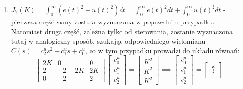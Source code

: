 \documentclass{article}
\begin{document}
\begin{enumerate}[(a)]
\begin{enumerate}[label=(\arabic*.)]
$$\begin{array}{c}
                    -K < 0\\
                    \lambda(-K) = 0
                \end{array}
                \right\}
                \implies
                \left\{
                \begin{array}{c}
                    K = 1\\
                    \lambda = 0
                \end{array}
                \right\}.
            $$
            Zatem optymalna wartość wskaźnika jakości wynosi:
            $$
                J_{1}(1) = \frac{1}{2} + \frac{1}{2} = 1.
            $$
            \item $J_{7}(K) = \int_{0}^{\infty}{\left( e(t)^2 + u(t)^2 \right)dt} = \int_{0}^{\infty}{e(t)^2dt} + \int_{0}^{\infty}{u(t)^2dt}$ - pierwsza część sumy została wyznaczona w poprzednim przypadku.
            Natomiast druga część, zależna tylko od sterowania, zostanie wyznaczona tutaj w analogiczny sposób, szukając odpowiedniego wielomianu $C(s) = c_{2}^{u}s^2 + c_{1}^{u}s + c_{0}^{u}$, co w tym przypadku prowadzi do układu równań:
            $$
                \begin{bmatrix}
                    2K & 0 & 0\\
                    2 & -2-2K & 2K\\
                    0 & -2 & 2
                \end{bmatrix}
                \begin{bmatrix}
                    c_{0}^{u}\\
                    c_{1}^{u}\\
                    c_{2}^{u}
                \end{bmatrix}
                =
                \begin{bmatrix}
                    K^2\\
                    K^2\\
                    K^2
                \end{bmatrix}
                \implies
                \begin{bmatrix}
                    c_{0}^{u}\\
                    c_{1}^{u}\\
                    c_{2}^{u}
                \end{bmatrix}
                =
                \begin{bmatrix}
                    \frac{K}{2}\\

\end{bmatrix}$$
\end{enumerate}
\end{enumerate}
\end{document}
